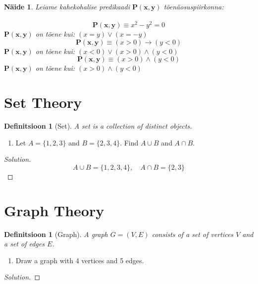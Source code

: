 \documentclass[12pt]{article}
\newtheorem{definition}[theorem]{Definitsioon}
\newtheorem{example}[theorem]{Näide}
\newenvironment{problem}[1][]{
    \begin{enumerate}[label=\textbf{Problem \arabic*.}, ref=#1, leftmargin=*, topsep=0.5em]
}{\end{enumerate}}
\newenvironment{solution}{
    \begin{proof}[Solution]
}{\end{proof}}
\newcommand{\set}[1]{\{#1\}} %
\begin{document}
\begin{example} 
	Leiame kahekohalise predikaadi $\mathbf{P(x,y)}$ tõenäosuspiirkonna: \\ 
	\\ 
	\[ 
		\mathbf{P(x,y)} \equiv x^2 - y^2 = 0
		\]
		\textit{$\mathbf{P(x,y)}$ on tõene kui: $(x = y) \vee (x = -y)$} \\
	

	\[
	\mathbf{P(x,y)} \equiv (x > 0) \rightarrow (y < 0)
	\]
	\textit{$\mathbf{P(x,y)}$ on tõene kui: $(x < 0) \vee (x > 0) \wedge (y<0)$} \\

 
	\[ 
	\mathbf{P(x,y)} \equiv (x > 0) \wedge (y < 0) 
	\]
\textit{$\mathbf{P(x,y)}$ on tõene kui: $(x > 0) \wedge (y < 0)$}
\end{example}

\newpage

\section{Set Theory}
\begin{definition}[Set]
A set is a collection of distinct objects.
\end{definition}

\begin{problem}
\item Let \( A = \set{1, 2, 3} \) and \( B = \set{2, 3, 4} \). Find \( A \cup B \) and \( A \cap B \).
\end{problem}

\begin{solution}
\[
A \cup B = \set{1, 2, 3, 4}, \quad A \cap B = \set{2, 3}
\]
\end{solution}
\newpage
\section{Graph Theory}
\begin{definition}[Graph]
A graph \( G = (V, E) \) consists of a set of vertices \( V \) and a set of edges \( E \).
\end{definition}

\begin{problem}
\item Draw a graph with 4 vertices and 5 edges.
\end{problem}

\begin{solution}
\end{solution}

\end{document}
